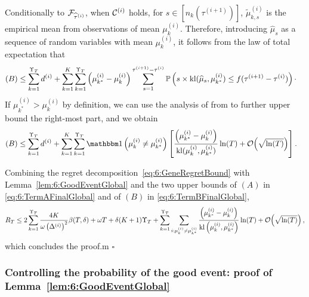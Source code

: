 Conditionally to $\mathcal{F}_{\widehat{\tau}^{(i)}}$, when $\mathcal{C}^{(i)}$ holds, for $s \in [n_k(\tau^{(i+1)})]$, $\widetilde{\mu}_{k,s}^{(i)}$ is the empirical mean from \iid{} observations of mean $\mu_k^{(i)}$.
Therefore, introducing $\widehat{\mu}_s$ as a sequence of \iid{} random variables with mean $\mu_k^{(i)}$, it follows from the law of total expectation that
\begin{align*}
    (B)& \leq \sum_{k=1}^{\Upsilon_T}d^{(i)}+\sum_{k=1}^K\sum_{k=1}^{\Upsilon_T}\left(\mu_{k^*}^{(i)} - \mu_k^{(i)}\right) \sum_{s=1}^{\tau^{(i+1)}-\tau^{(i)}}\mathbb{P}\left(s \times \mathrm{kl}(\widehat{\mu}_{s}, \mu_{k^*}^{(i)}) \leq f(\tau^{(i+1)} - \tau^{(i)})\right)\cdot
\end{align*}
%
If $\mu_{k^*}^{(i)} > \mu_k^{(i)}$ by definition, we can use the analysis of \klUCB{} from \cite{KLUCBJournal} to further upper bound the right-most part, and we obtain
%
\begin{align}\label{eq:6:TermBFinalGlobal}
    (B) & \leq \sum_{k=1}^{\Upsilon_T}d^{(i)}+\sum_{k=1}^K\sum_{k=1}^{\Upsilon_T}\indic\left(\mu_k^{(i)} \neq \mu_{k^*}^{(i)}\right)\left[ \frac{\left(\mu_{k^*}^{(i)} - \mu_k^{(i)}\right)}{\kl(\mu_k^{(i)},\mu_{k^*}^{(i)})}\log(T) + \bigO{\sqrt{\log(T)}}\right].
\end{align}

Combining the regret decomposition~\eqref{eq:6:GeneRegretBound} with Lemma~\ref{lem:6:GoodEventGlobal} and the two upper bounds of $(A)$ in \eqref{eq:6:TermAFinalGlobal} and of $(B)$ in \eqref{eq:6:TermBFinalGlobal},
\[R_T \leq 2\sum_{k=1}^{\Upsilon_T} \frac{4K}{\omega \left(\Delta^{(i)}\right)^2}\beta(T,\delta) +\omega T + \delta (K+1)\Upsilon_T  + \sum_{k=1}^{\Upsilon_T}\sum_{i : \mu_k^{(i)} \neq \mu_{k^*}^{(i)}} \frac{\left( \mu_{k^*}^{(i)}-\mu_k^{(i)}\right)}{\mathrm{kl}\left(\mu_k^{(i)},\mu_{k^*}^{(i)}\right)}\ln(T) + \mathop{}\mathopen{}\mathcal{O}\mathopen{}\left(\sqrt{\ln(T)}\right),\]
which concludes the proof.m
%
\hfill{}$\square$

\subsubsection{Controlling the probability of the good event: proof of Lemma~\ref{lem:6:GoodEventGlobal}}


